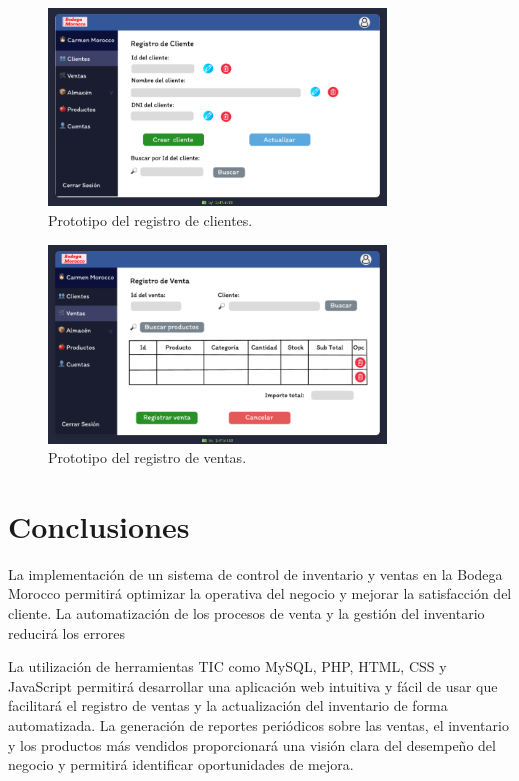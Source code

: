 \documentclass{article}
\begin{document}
\begin{figure}[H]
  \centering
  \includegraphics[width=0.8\textwidth]{./assets/registro.png}
  \caption{Prototipo del registro de clientes.}
\end{figure}

\begin{figure}[H]
  \centering
  \includegraphics[width=0.8\textwidth]{./assets/venta.png}
  \caption{Prototipo del registro de ventas.}
\end{figure}

\newpage

\section{Conclusiones}

  La implementación de un sistema de control de inventario y ventas en la Bodega Morocco permitirá optimizar la operativa del negocio y mejorar la satisfacción del cliente. La automatización de los procesos de venta y la gestión del inventario reducirá los errores

  La utilización de herramientas TIC como MySQL, PHP, HTML, CSS y JavaScript permitirá desarrollar una aplicación web intuitiva y fácil de usar que facilitará el registro de ventas y la actualización del inventario de forma automatizada. La generación de reportes periódicos sobre las ventas, el inventario y los productos más vendidos proporcionará una visión clara del desempeño del negocio y permitirá identificar oportunidades de mejora.
\end{document}

